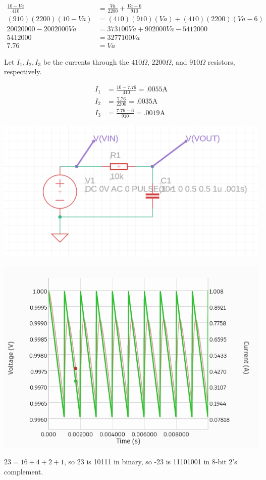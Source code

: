 \documentclass{article}
\begin{document}
\medskip
{}
\begin{align*}
    \frac{10-Va}{410} &= \frac{Va}{2200} + \frac{Va-6}{910} \\
    (910)(2200)(10-Va) &= (410)(910)(Va) + (410)(2200)(Va-6) \\
    20020000 - 2002000Va &= 373100Va + 902000Va - 5412000 \\
    5412000 &= 3277100Va \\
    7.76 &= Va
\end{align*}

Let $I_1, I_2, I_3$ be the currents through the $410\Omega$, $2200\Omega$, and $910\Omega$ resistors, respectively.

\begin{align*}
    I_1 &= \frac{10 - 7.76}{410} = .0055\text{A} \\
    I_2 &= \frac{7.76}{2200} = .0035\text{A} \\
    I_3 &= \frac{7.76-6}{910} = .0019\text{A}
\end{align*}

\newpage
{}

    \begin{center}
    \includegraphics[scale=.4]{hw2-schematic.png}
    
    \medskip

    \includegraphics[scale=.8]{hw2-graph.png}
    \end{center}

\medskip
{}

    $23 = 16 + 4 + 2 + 1$, so 23 is 10111 in binary, so -23 is 11101001 in 8-bit 2's complement.
\end{document}
